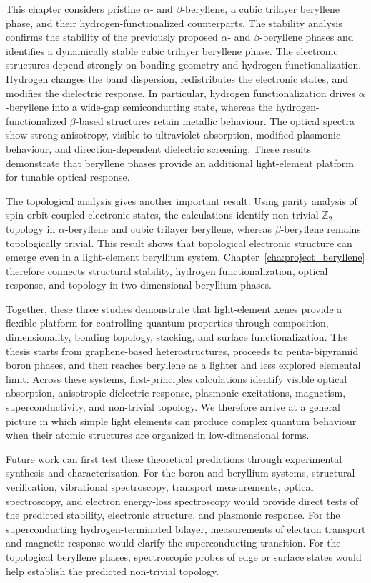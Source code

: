This chapter considers pristine $\alpha$- and $\beta$-beryllene, a cubic trilayer beryllene phase, and their hydrogen-functionalized counterparts.
The stability analysis confirms the stability of the previously proposed $\alpha$- and $\beta$-beryllene phases and identifies a dynamically stable cubic trilayer beryllene phase.
The electronic structures depend strongly on bonding geometry and hydrogen functionalization.
Hydrogen changes the band dispersion, redistributes the electronic states, and modifies the dielectric response.
In particular, hydrogen functionalization drives $\alpha$-beryllene into a wide-gap semiconducting state, whereas the hydrogen-functionalized $\beta$-based structures retain metallic behaviour.
The optical spectra show strong anisotropy, visible-to-ultraviolet absorption, modified plasmonic behaviour, and direction-dependent dielectric screening.
These results demonstrate that beryllene phases provide an additional light-element platform for tunable optical response.

The topological analysis gives another important result.
Using parity analysis of spin-orbit-coupled electronic states, the calculations identify non-trivial $\mathbb{Z}_2$ topology in $\alpha$-beryllene and cubic trilayer beryllene, whereas $\beta$-beryllene remains topologically trivial.
This result shows that topological electronic structure can emerge even in a light-element beryllium system.
Chapter~\ref{cha:project_beryllene} therefore connects structural stability, hydrogen functionalization, optical response, and topology in two-dimensional beryllium phases.

Together, these three studies demonstrate that light-element xenes provide a flexible platform for controlling quantum properties through composition, dimensionality, bonding topology, stacking, and surface functionalization.
The thesis starts from graphene-based heterostructures, proceeds to penta-bipyramid boron phases, and then reaches beryllene as a lighter and less explored elemental limit.
Across these systems, first-principles calculations identify visible optical absorption, anisotropic dielectric response, plasmonic excitations, magnetism, superconductivity, and non-trivial topology.
We therefore arrive at a general picture in which simple light elements can produce complex quantum behaviour when their atomic structures are organized in low-dimensional forms.

Future work can first test these theoretical predictions through experimental synthesis and characterization.
For the boron and beryllium systems, structural verification, vibrational spectroscopy, transport measurements, optical spectroscopy, and electron energy-loss spectroscopy would provide direct tests of the predicted stability, electronic structure, and plasmonic response.
For the superconducting hydrogen-terminated  bilayer, measurements of electron transport and magnetic response would clarify the superconducting transition.
For the topological beryllene phases, spectroscopic probes of edge or surface states would help establish the predicted non-trivial topology.

